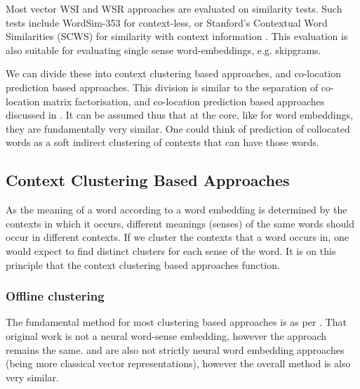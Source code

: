 \documentclass[12pt,parskip]{komatufte}
\begin{document}
Most vector WSI and WSR approaches are evaluated on similarity tests.
Such tests include WordSim-353 \parencite{WordSim353} for context-less, or Stanford's Contextual Word Similarities (SCWS) for similarity with context information \parencite{Huang2012}.
This evaluation is also suitable for evaluating single sense word-embeddings, e.g. skipgrams.


We can divide these into context clustering based approaches,
and co-location prediction based approaches.
This division is similar to the separation of co-location matrix factorisation,
and co-location prediction based approaches discussed in .
It can be assumed thus that at the core, like for word embeddings,
they are fundamentally very similar.
One could think of prediction of collocated words as a soft indirect clustering of contexts that can have those words.


\subsection{Context Clustering Based Approaches}
As the meaning of a word according to a word embedding is determined by the contexts in which it occurs, different meanings (senses) of the same words should occur in different contexts.
If we cluster the contexts that a word occurs in, one would expect to find distinct clusters for each sense of the word.
It is on this principle that the context clustering based approaches function.



\subsubsection{Offline clustering}\label{sec:offline-clustering}
The fundamental method for most clustering based approaches is as per .
That original work is not a neural word-sense embedding, however the approach remains the same.
 and  are also not strictly neural word embedding approaches (being more classical vector representations), however the overall method is also very similar.


\end{document}
